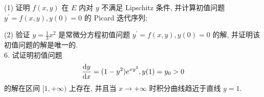\documentclass[UTF8]{ctexart}
\begin{document}
(1) 证明 $f(x,y)$ 在 $E$ 内对 $y$ 不满足 Lipschitz 条件, 并计算初值问题 $y^{\prime}=f(x,y),y(0)=0$ 的 Picard 迭代序列;

(2) 验证 $\displaystyle y=\frac{1}{3}x^2$ 是常微分方程初值问题 $y^{\prime}=f(x,y),y(0)=0$ 的解, 并证明该初值问题的解是唯一的.
\\

6. 试证明初值问题
\[
\frac{{\rm d}y}{{\rm d}x}=(1-y^2)e^{xy^2},y(1)=y_0>0
\]
的解在区间 $[1,+\infty)$ 上存在, 并且当 $x\rightarrow+\infty$ 时积分曲线趋近于直线 $y=1$.
\end{document}
